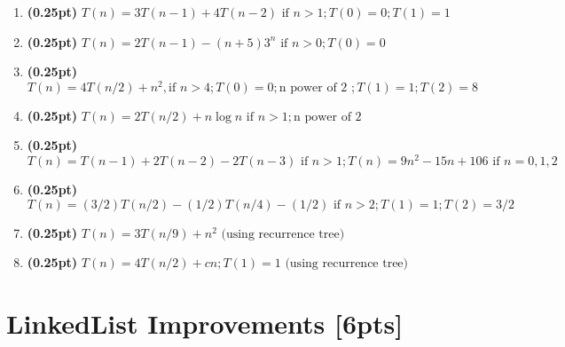 \documentclass{article}
\begin{document}
\begin{enumerate}[label=\Alph*]
  \item \textbf{(0.25pt)} $T(n) = 3T(n-1) + 4T(n-2) \mbox{ if } n>1; T(0)=0; T(1)=1$
  \item \textbf{(0.25pt)} $T(n) = 2T(n-1) - (n+5)3^n \mbox{ if } n>0; T(0)=0$
  
  
  \item \textbf{(0.25pt)} $T(n) = 4T(n/2) + n^2, \mbox{if } n>4; T(0)=0; \mbox{n power of 2 }; T(1)=1; T(2)=8$
  \item \textbf{(0.25pt)} $T(n) = 2T(n/2) + n\log n \mbox{ if } n>1; \mbox{n power of 2}$
  
  \item \textbf{(0.25pt)} $T(n) = T(n-1) + 2T(n-2)-2T(n-3) \mbox{ if } n>1; T(n)=9n^2-15n+106 \mbox{ if } n=0,1,2$
  \item \textbf{(0.25pt)} $T(n)= (3/2)T(n/2) - (1/2)T(n/4)- (1/2) \mbox{ if } n>2; T(1)=1; T(2)=3/2$
  
  \item \textbf{(0.25pt)} $T(n) = 3T(n/9) + n^2 \mbox{ (using recurrence tree)}$
  \item \textbf{(0.25pt)} $T(n) = 4T(n/2) + cn; T(1)=1  \mbox{ (using recurrence tree)}$
\end{enumerate}


\section{LinkedList Improvements [6pts]}
\end{document}
